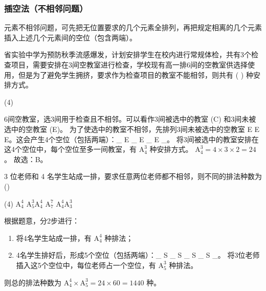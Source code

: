 \subsubsection{插空法（不相邻问题）}
元素不相邻问题，可先把无位置要求的几个元素全排列，再把规定相离的几个元素插入上述几个元素间的空位（包含两端）。

\begin{example}
    省实验中学为预防秋季流感爆发，计划安排学生在校内进行常规体检，共有3个检查项目，需要安排在3间空教室进行检查，学校现有高一排6间的空教室供选择使用，但是为了避免学生拥挤，要求作为检查项目的教室不能相邻，则共有 (\hspace{0.7cm}
    ) 种安排方式。
    \begin{tasks}(4)
    \end{tasks}
\end{example}

\begin{solution}
    6间空教室，选3间用于检查且不相邻。可以看作3间被选中的教室 (C) 和3间未被选中的空教室 (E)。
    为了使选中的教室不相邻，先排列3间未被选中的空教室 E E E。这会产生4个空位（包括两端）：\_ E \_ E \_ E \_。
    将3间被选中的教室安排在这4个空位中，每个空位至多一间教室，有 $\mathrm{A}_{4}^{3}$ 种安排方式。
    $\mathrm{A}_{4}^{3} = 4 \times 3 \times 2 = 24$。
    故选：B。
\end{solution}

\begin{example}
    3 位老师和 4 名学生站成一排，要求任意两位老师都不相邻，则不同的排法种数为 (\hspace{0.7cm})
    \begin{tasks}(4)
        \task $\mathrm{A}_{4}^{4}$
        \task $\mathrm{A}_{5}^{3} \mathrm{A}_{4}^{4}$
        \task $\mathrm{A}_{7}^{7}$
        \task $\mathrm{A}_{4}^{4} \mathrm{A}_{3}^{3}$
    \end{tasks}
\end{example}

\begin{solution}
    根据题意，分2步进行：

    \begin{enumerate}
        \item 将4名学生站成一排，有 $\mathrm{A}_{4}^{4}$ 种排法；
        \item 4名学生排好后，形成5个空位（包括两端）：\_ S \_ S \_ S \_ S \_。
              将3位老师插入这5个空位中，每位老师占一个空位，有 $\mathrm{A}_{5}^{3}$ 种排法。
    \end{enumerate}

    则总的排法种数为 $\mathrm{A}_{4}^{4} \times \mathrm{A}_{5}^{3} = 24 \times 60 = 1440$ 种。
\end{solution}

